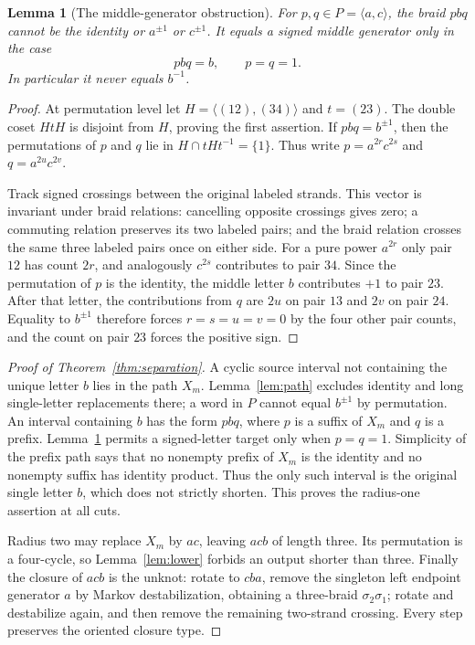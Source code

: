 \documentclass[11pt,a4paper]{article}
\newtheorem{lemma}[theorem]{Lemma}
\theoremstyle{definition}\newtheorem{definition}[theorem]{Definition}
\theoremstyle{remark}\newtheorem{remark}[theorem]{Remark}
\begin{document}
\begin{lemma}[The middle-generator obstruction]\label{lem:doublecoset}
For $p,q\in P=\langle a,c\rangle$, the braid $p b q$ cannot be the identity
or $a^{\pm1}$ or $c^{\pm1}$. It equals a signed middle generator only in
the case
\[
 p b q=b,\qquad p=q=1.
\]
In particular it never equals $b^{-1}$.
\end{lemma}
\begin{proof}
At permutation level let
$H=\langle(12),(34)\rangle$ and $t=(23)$. The double coset $HtH$ is
disjoint from $H$, proving the first assertion. If $p b q=b^{\pm1}$,
then the permutations of $p$ and $q$ lie in
$H\cap tHt^{-1}=\{1\}$. Thus write
$p=a^{2r}c^{2s}$ and $q=a^{2u}c^{2v}$.

Track signed crossings between the original labeled strands. This vector
is invariant under braid relations: cancelling opposite crossings gives
zero; a commuting relation preserves its two labeled pairs; and the braid
relation crosses the same three labeled pairs once on either side.
For a pure power $a^{2r}$ only pair $12$ has count $2r$, and analogously
$c^{2s}$ contributes to pair $34$. Since the permutation of $p$ is the
identity, the middle letter $b$ contributes $+1$ to pair $23$.
After that letter, the contributions from $q$ are $2u$ on pair $13$ and
$2v$ on pair $24$. Equality to $b^{\pm1}$ therefore forces
$r=s=u=v=0$ by the four other pair counts, and the count on pair $23$
forces the positive sign.
\end{proof}

\begin{proof}[Proof of Theorem~\ref{thm:separation}]
A cyclic source interval not containing the unique letter $b$ lies in the
path $X_m$. Lemma~\ref{lem:path} excludes identity and long single-letter
replacements there; a word in $P$ cannot equal $b^{\pm1}$ by permutation.
An interval containing $b$ has the form $p b q$, where $p$ is a suffix of
$X_m$ and $q$ is a prefix. Lemma~\ref{lem:doublecoset} permits a signed-letter
target only when $p=q=1$. Simplicity of the prefix path says that no
nonempty prefix of $X_m$ is the identity and no nonempty suffix has identity
product. Thus the only such interval is the original single letter $b$,
which does not strictly shorten. This proves the radius-one assertion at
all cuts.

Radius two may replace $X_m$ by $ac$, leaving $acb$ of length three.
Its permutation is a four-cycle, so Lemma~\ref{lem:lower} forbids an output
shorter than three. Finally the closure of $acb$ is the unknot: rotate to
$cba$, remove the singleton left endpoint generator $a$ by Markov
destabilization, obtaining a three-braid $\sigma_2\sigma_1$; rotate and
destabilize again, and then remove the remaining two-strand crossing.
Every step preserves the oriented closure type.
\end{proof}
\end{document}
